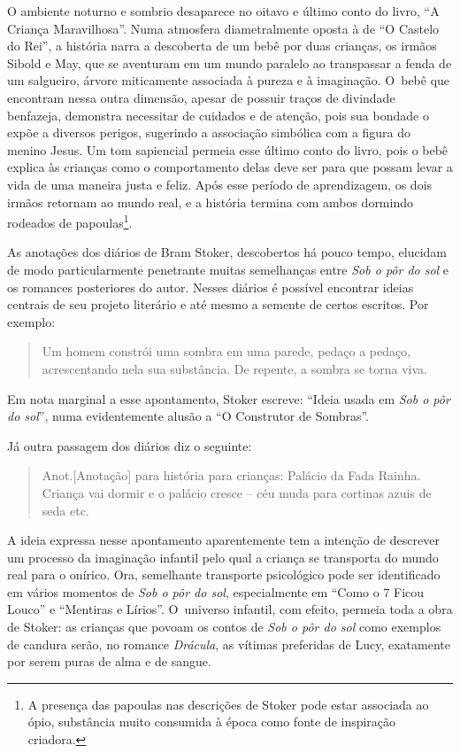 O ambiente noturno e sombrio desaparece no oitavo e último conto do
livro, ``A Criança Maravilhosa''. Numa atmosfera diametralmente oposta à
de ``O Castelo do Rei'', a história narra a descoberta de um bebê por
duas crianças, os irmãos Sibold e May, que se aventuram em um mundo
paralelo ao transpassar a fenda de um salgueiro, árvore miticamente
associada à pureza e à imaginação. O~bebê que encontram nessa outra
dimensão, apesar de possuir traços de divindade benfazeja, demonstra
necessitar de cuidados e de atenção, pois sua bondade o expõe a diversos
perigos, sugerindo a associação simbólica com a figura do menino Jesus.
Um tom sapiencial permeia esse último conto do livro, pois o bebê
explica às crianças como o comportamento delas deve ser para que possam
levar a vida de uma maneira justa e feliz. Após esse período de
aprendizagem, os dois irmãos retornam ao mundo real, e a história
termina com ambos dormindo rodeados de
papoulas\footnote{A presença das papoulas nas descrições de
Stoker pode estar associada ao ópio, substância muito consumida à época
como fonte de inspiração criadora.}.

\asterisc{}


As anotações dos diários de Bram Stoker, descobertos há pouco tempo,
elucidam de modo particularmente penetrante muitas semelhanças entre \emph{Sob
o pôr do sol} e os romances posteriores do autor. Nesses diários é
possível encontrar ideias centrais de seu projeto literário e até mesmo
a semente de certos escritos. Por exemplo:

 

\begin{quote}
Um homem constrói uma sombra em uma parede, pedaço a pedaço,
acrescentando nela sua substância. De repente, a sombra se torna viva.

 

\end{quote}
Em nota marginal a esse apontamento, Stoker escreve: ``Ideia usada em
\emph{Sob o pôr do sol}'', numa evidentemente alusão a ``O Construtor de
Sombras''.

Já outra passagem dos diários diz o seguinte:

 

\begin{quote}
Anot.{[}Anotação{]} para história para crianças: Palácio da Fada Rainha.
Criança vai dormir e o palácio cresce -- céu muda para cortinas azuis de
seda etc.

 

\end{quote}
A ideia expressa nesse apontamento aparentemente tem a intenção de
descrever um processo da imaginação infantil pelo qual a criança se
transporta do mundo real para o onírico. Ora, semelhante transporte
psicológico pode ser identificado em vários momentos de \emph{Sob o pôr do
sol}, especialmente em ``Como o 7 Ficou Louco'' e ``Mentiras e Lírios''.
O~universo infantil, com efeito, permeia toda a obra de Stoker: as
crianças que povoam os contos de \emph{Sob o pôr do sol} como exemplos de
candura serão, no romance \emph{Drácula}, as vítimas preferidas de Lucy,
exatamente por serem puras de alma e de sangue.

